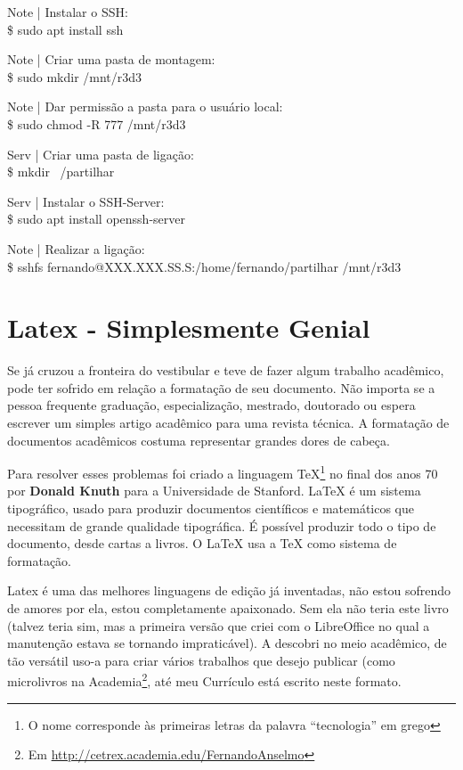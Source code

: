 Note | Instalar o SSH: \\
{\ttfamily\$ sudo apt install ssh}

Note | Criar uma pasta de montagem: \\
{\ttfamily\$ sudo mkdir /mnt/r3d3}

Note | Dar permissão a pasta para o usuário local: \\
{\ttfamily\$ sudo chmod -R 777 /mnt/r3d3}

Serv | Criar uma pasta de ligação: \\
{\ttfamily\$ mkdir ~/partilhar}

Serv | Instalar o SSH-Server: \\
{\ttfamily\$ sudo apt install openssh-server}

Note | Realizar a ligação: \\
{\ttfamily\$ sshfs fernando@XXX.XXX.SS.S:/home/fernando/partilhar /mnt/r3d3}

\section{Latex - Simplesmente Genial}
Se já cruzou a fronteira do vestibular e teve de fazer algum trabalho acadêmico, pode ter sofrido em relação a formatação de seu documento. Não importa se a pessoa frequente graduação, especialização, mestrado, doutorado ou espera escrever um simples artigo acadêmico para uma revista técnica. A formatação de documentos acadêmicos costuma representar grandes dores de cabeça.

Para resolver esses problemas foi criado a linguagem TeX\footnote{O nome corresponde às primeiras letras da palavra “tecnologia” em grego} no final dos anos 70 por \textbf{Donald Knuth} para a Universidade de Stanford. LaTeX é um sistema tipográfico, usado para produzir documentos científicos e matemáticos que necessitam de grande qualidade tipográfica. É possível produzir todo o tipo de documento, desde cartas a livros. O LaTeX usa a TeX como sistema de formatação.

Latex é uma das melhores linguagens de edição já inventadas, não estou sofrendo de amores por ela, estou completamente apaixonado. Sem ela não teria este livro (talvez teria sim, mas a primeira versão que criei com o LibreOffice no qual a manutenção estava se tornando impraticável). A descobri no meio acadêmico, de tão versátil uso-a para criar vários trabalhos que desejo publicar (como microlivros na Academia\footnote{Em \url{http://cetrex.academia.edu/FernandoAnselmo}}, até meu Currículo está escrito neste formato.

